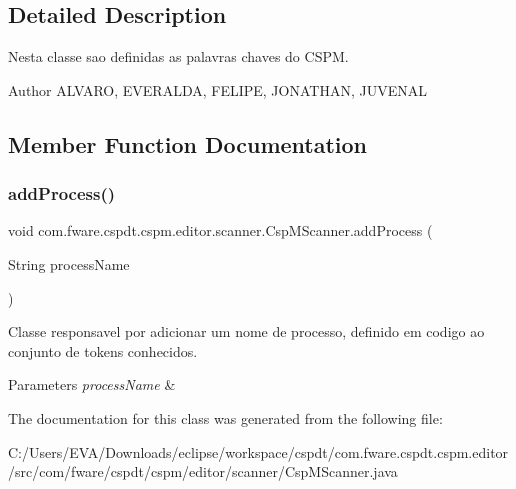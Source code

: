 \subsection{Detailed Description}
Nesta classe sao definidas as palavras chaves do C\+S\+PM. 

\begin{DoxyAuthor}{Author}
A\+L\+V\+A\+RO, E\+V\+E\+R\+A\+L\+DA, F\+E\+L\+I\+PE, J\+O\+N\+A\+T\+H\+AN, J\+U\+V\+E\+N\+AL 
\end{DoxyAuthor}


\subsection{Member Function Documentation}
\mbox{\label{classcom_1_1fware_1_1cspdt_1_1cspm_1_1editor_1_1scanner_1_1_csp_m_scanner_af76db62b0ad376ba6d53325a76f7a9e7}} 
\subsubsection{\texorpdfstring{add\+Process()}{addProcess()}}
{\footnotesize\ttfamily void com.\+fware.\+cspdt.\+cspm.\+editor.\+scanner.\+Csp\+M\+Scanner.\+add\+Process (\begin{DoxyParamCaption}\item[{String}]{process\+Name }\end{DoxyParamCaption})\hspace{0.3cm}{\ttfamily [inline]}}



Classe responsavel por adicionar um nome de processo, definido em codigo ao conjunto de tokens conhecidos. 


\begin{DoxyParams}{Parameters}
{\em process\+Name} & \\
\hline
\end{DoxyParams}


The documentation for this class was generated from the following file\+:\begin{DoxyCompactItemize}
\item 
C\+:/\+Users/\+E\+V\+A/\+Downloads/eclipse/workspace/cspdt/com.\+fware.\+cspdt.\+cspm.\+editor/src/com/fware/cspdt/cspm/editor/scanner/Csp\+M\+Scanner.\+java\end{DoxyCompactItemize}
